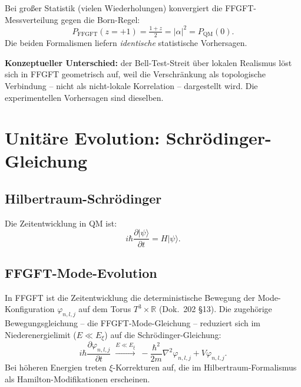 Bei großer Statistik (vielen Wiederholungen) konvergiert die
FFGFT-Messverteilung gegen die Born-Regel:
\begin{equation}
  P_\text{FFGFT}(z = +1) = \tfrac{1+z}{2} = |\alpha|^2 = P_\text{QM}(0).
\end{equation}
Die beiden Formalismen liefern \emph{identische} statistische
Vorhersagen.

\textbf{Konzeptueller Unterschied:} der Bell-Test-Streit über lokalen
Realismus löst sich in FFGFT geometrisch auf, weil die Verschränkung
als topologische Verbindung -- nicht als nicht-lokale Korrelation --
dargestellt wird. Die experimentellen Vorhersagen sind dieselben.

\section{Unitäre Evolution: Schrödinger-Gleichung}

\subsection{Hilbertraum-Schrödinger}

Die Zeitentwicklung in QM ist:
\begin{equation}
  i\hbar \frac{\partial |\psi\rangle}{\partial t} = H |\psi\rangle.
\end{equation}

\subsection{FFGFT-Mode-Evolution}

In FFGFT ist die Zeitentwicklung die deterministische Bewegung der
Mode-Konfiguration $\varphi_{n,l,j}$ auf dem Torus
$T^3 \times \mathbb{R}$ (Dok.~202 §13). Die zugehörige
Bewegungsgleichung -- die FFGFT-Mode-Gleichung -- reduziert sich im
Niederenergielimit ($E \ll E_\xi$) auf die Schrödinger-Gleichung:
\begin{equation}
  i\hbar \frac{\partial \varphi_{n,l,j}}{\partial t}
  \;\xrightarrow{E \ll E_\xi}\;
  -\frac{\hbar^2}{2m}\nabla^2 \varphi_{n,l,j} + V \varphi_{n,l,j}.
\end{equation}
Bei höheren Energien treten $\xi$-Korrekturen auf, die im
Hilbertraum-Formalismus als Hamilton-Modifikationen erscheinen.

